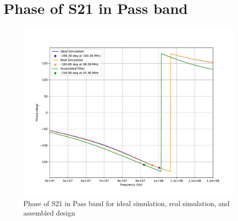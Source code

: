 \documentclass[letterpaper,12pt]{article}
\begin{document}
\newpage
\section{Phase of S21 in Pass band\label{sec:phase}}
\begin{figure}[H]
    \includegraphics[width=\linewidth]{figures/5.phase}
    \caption{Phase of S21 in Pass band for ideal simulation, real simulation, and assembled design}
\end{figure}

\newpage
\end{document}

